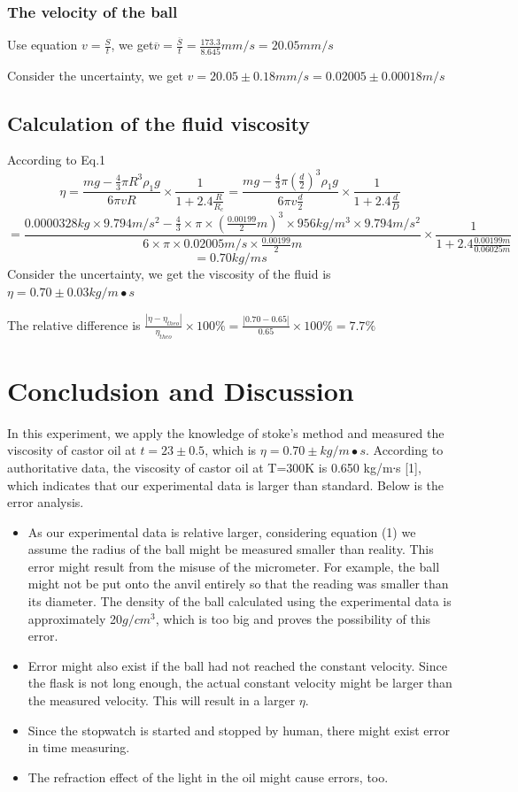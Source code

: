 \documentclass[12pt,a4paper]{article}
\begin{document}
\subsubsection{The velocity of the ball}
Use equation $v=\frac{S}{t}$, we get$\overline{v}=\frac{\overline{S}}{t}=\frac{173.3}{8.645}mm/s=20.05mm/s$\par 
Consider the uncertainty, we get
$v=20.05\pm0.18 mm/s=0.02005\pm 0.00018m/s$

\subsection{Calculation of the fluid viscosity}
According to Eq.1
$$\eta=\frac{mg-\frac{4}{3}\pi R^3 \rho_1 g}{6\pi vR}\times\frac{1}{1+2.4\frac{R}{R_c}}=\frac{mg-\frac{4}{3}\pi (\frac{d}{2})^3 \rho_1 g}{6\pi v\frac{d}{2}}\times\frac{1}{1+2.4\frac{d}{D}}$$
$$=\frac{0.0000328kg\times 9.794m/s^2-\frac{4}{3}\times\pi\times (\frac{0.00199}{2}m)^3\times 956kg/m^3\times 9.794m/s^2}{6\times\pi\times 0.02005m/s\times \frac{0.00199}{2}m}\times\frac{1}{1+2.4\frac{0.00199m}{0.06025m}}$$
$$=0.70kg/ms$$
Consider the uncertainty, we get the viscosity of the fluid is $\eta=0.70\pm0.03 kg/m∙s$ \par
The relative difference is $\frac{|\eta-\eta_{theo}|}{\eta_{theo}}\times 100\%=\frac{|0.70-0.65|}{0.65}\times 100\%=7.7\%$


\section{Concludsion and Discussion}
In this experiment, we apply the knowledge of stoke’s method and measured the viscosity of castor oil at $t=23\pm 0.5$\textcelsius, which is $\eta =0.70\pm kg/m∙s$.
According to authoritative data, the viscosity of castor oil at T=300K is 0.650 kg/m∙s [1], which indicates that our experimental data is larger than standard. Below is the error analysis.
\begin{itemize}
    \item As our experimental data is relative larger, considering equation (1) we assume the radius of the ball might be measured smaller than reality. This error might result from the misuse of the micrometer. For example, the ball might not be put onto the anvil entirely so that the reading was smaller than its diameter. The density of the ball calculated using the experimental data is approximately 20$g/cm^3$, which is too big and proves the possibility of this error.
    \item Error might also exist if the ball had not reached the constant velocity. Since the flask is not long enough, the actual constant velocity might be larger than the measured velocity. This will result in a larger $\eta$.
    \item Since the stopwatch is started and stopped by human, there might exist error in time measuring. 
    \item The refraction effect of the light in the oil might cause errors, too.
\end{itemize} \par
\end{document}
